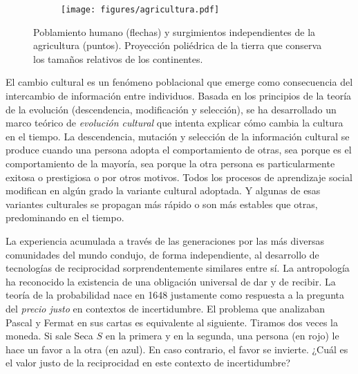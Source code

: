 \documentclass[a4paper,10pt]{book}
\theoremstyle{definition}
\begin{document}
\begin{figure}[ht!]
    \centering
    \begin{subfigure}[b]{0.6\textwidth}
     \texttt{[image: figures/agricultura.pdf]}
     \label{fig:agricultura}
    \end{subfigure}
    \caption{
    Poblamiento humano (flechas) y surgimientos independientes de la agricultura (puntos).
    Proyecci\'on poli\'edrica de la tierra que conserva los tama\~nos relativos de los continentes.
    }%
    \label{fig:poblamiento}
\end{figure}

El cambio cultural es un fen\'omeno poblacional que emerge como consecuencia del intercambio de informaci\'on entre individuos.
%
Basada en los principios de la teor\'ia de la evoluci\'on (descendencia, modificaci\'on y selecci\'on), se ha desarrollado un marco te\'orico de \emph{evoluci\'on cultural} que intenta explicar c\'omo cambia la cultura en el tiempo.
%
La descendencia, mutaci\'on y selecci\'on de la informaci\'on cultural se produce cuando una persona adopta el comportamiento de otras, sea porque es el comportamiento de la mayor\'ia, sea porque la otra persona es particularmente exitosa o prestigiosa o por otros motivos.
%
Todos los procesos de aprendizaje social modifican en alg\'un grado la variante cultural adoptada.
%
Y algunas de esas variantes culturales se propagan m\'as r\'apido o son m\'as estables que otras, predominando en el tiempo.


La experiencia acumulada a trav\'es de las generaciones por las m\'as diversas comunidades del mundo condujo, de forma independiente, al desarrollo de tecnolog\'ias de reciprocidad sorprendentemente similares entre s\'i.
%
La antropolog\'ia ha reconocido la existencia de una obligaci\'on universal de dar y de recibir.
%
La teor\'ia de la probabilidad nace en 1648 justamente como respuesta a la pregunta del \emph{precio justo} en contextos de incertidumbre.
%
El problema que analizaban Pascal y Fermat en sus cartas es equivalente al siguiente.
%
Tiramos dos veces la moneda.
%
Si sale Seca $S$ en la primera y en la segunda, una persona (en rojo) le hace un favor a la otra (en azul).
%
En caso contrario, el favor se invierte.
%
¿Cu\'al es el valor justo de la reciprocidad en este contexto de incertidumbre?
\end{document}
